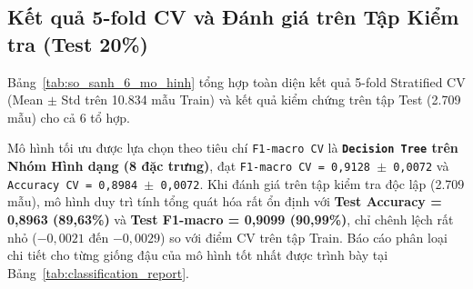\documentclass[a4paper,12pt]{report}
\begin{document}
\subsection{Kết quả 5-fold CV và Đánh giá trên Tập Kiểm tra (Test 20\%)}
Bảng~\ref{tab:so_sanh_6_mo_hinh} tổng hợp toàn diện kết quả 5-fold Stratified CV (Mean $\pm$ Std trên 10.834 mẫu Train) và kết quả kiểm chứng trên tập Test (2.709 mẫu) cho cả 6 tổ hợp.

\begin{table}[H]
\centering
\caption{So sánh hiệu năng 6 tổ hợp mô hình qua 5-fold Stratified CV (Train) và đánh giá trên tập Test (20\%)}
\label{tab:so_sanh_6_mo_hinh}
\end{table}

Mô hình tối ưu được lựa chọn theo tiêu chí \texttt{F1-macro CV} là \textbf{\texttt{Decision Tree} trên Nhóm Hình dạng (8 đặc trưng)}, đạt \texttt{F1-macro CV = 0,9128 $\pm$ 0,0072} và \texttt{Accuracy CV = 0,8984 $\pm$ 0,0072}. Khi đánh giá trên tập kiểm tra độc lập (2.709 mẫu), mô hình duy trì tính tổng quát hóa rất ổn định với \textbf{Test Accuracy = 0,8963 (89,63\%)} và \textbf{Test F1-macro = 0,9099 (90,99\%)}, chỉ chênh lệch rất nhỏ ($-0,0021$ đến $-0,0029$) so với điểm CV trên tập Train. Báo cáo phân loại chi tiết cho từng giống đậu của mô hình tốt nhất được trình bày tại Bảng~\ref{tab:classification_report}.
\end{document}
